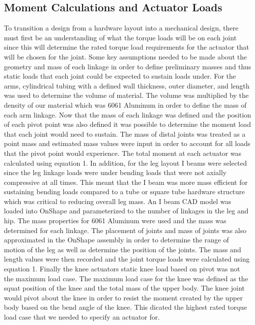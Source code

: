 \documentclass{article}
\begin{document}
\subsection{Moment Calculations and Actuator Loads}
To transition a design from a hardware layout into a mechanical design, there must first be an understanding of what the torque loads will be on each joint since this will determine the rated torque load requirements for the actuator that will be chosen for the joint. Some key assumptions needed to be made about the geometry and mass of each linkage in order to define preliminary masses and thus static loads that each joint could be expected to sustain loads under. For the arms, cylindrical tubing with a defined wall thickness, outer diameter, and length was used to determine the volume of material. The volume was multiplied by the density of our material which was 6061 Aluminum in order to define the mass of each arm linkage. Now that the mass of each linkage was defined and the position of each pivot point was also defined it was possible to determine the moment load that each joint would need to sustain. The mass of distal joints was treated as a point mass and estimated mass values were input in order to account for all loads that the pivot point would experience. The total moment at each actuator was calculated using equation 1. In addition, for the leg layout I beams were selected since the leg linkage loads were under bending loads that were not axially compressive at all times. This meant that the I beam was more mass efficient for sustaining bending loads compared to a tube or square tube hardware structure which was critical to reducing overall leg mass. An I beam CAD model was loaded into OnShape and parameterized to the number of linkages in the leg and hip. The mass properties for 6061 Aluminum were used and the mass was determined for each linkage. The placement of joints and mass of joints was also approximated in the OnShape assembly in order to determine the range of motion of the leg as well as determine the position of the joints. The mass and length values were then recorded and the joint torque loads were calculated using equation 1. Finally the knee actuators static knee load based on pivot was not the maximum load case. The maximum load case for the knee was defined as the squat position of the knee and the total mass of the upper body. The knee joint would pivot about the knee in order to resist the moment created by the upper body based on the bend angle of the knee. This dicated the highest rated torque load case that we needed to specify an actuator for. 
\end{document}
